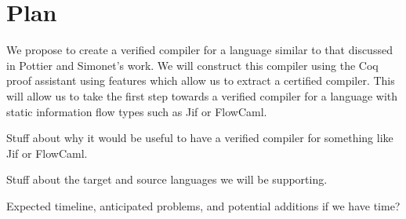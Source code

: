 \section{Plan}

We propose to create a verified compiler for a language similar to that
discussed in Pottier and Simonet's work\cite{InfoFlowML}.  We will
construct this compiler using the Coq proof assistant\cite{coq?} using
features which allow us to extract a certified compiler.  This will
allow us to take the first step towards a verified compiler for a
language with static information flow types such as Jif\cite{Jif?} or
FlowCaml\cite{FlowCaml?}.

Stuff about why it would be useful to have a verified compiler for
something like Jif or FlowCaml.

Stuff about the target and source languages we will be supporting.

Expected timeline, anticipated problems, and potential additions if we
have time?

